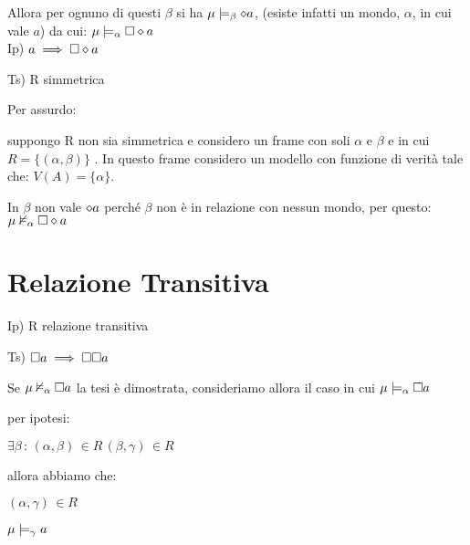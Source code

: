 Allora per ognuno di questi $\beta$ si ha $\mu\models_{\beta}\diamond a$,
(esiste infatti un mondo, $\alpha$, in cui vale $a$) da cui: $\mu\models_{\alpha}\square\diamond a$
\\


Ip) $a\implies\square\diamond a$

Ts) R simmetrica

Per assurdo:

suppongo R non sia simmetrica e considero un frame con soli $\alpha$
e $\beta$ e in cui $R=\{(\alpha,\beta)\}$ . In questo frame considero
un modello con funzione di verità tale che: $V(A)=\{\alpha\}$.

In $\beta$ non vale $\diamond a$ perché $\beta$ non è in relazione con
nessun mondo, per questo: $\mu\nvDash_{\alpha}\square\diamond a$

\begin{center}
\begin{center}   \end{center}
\par\end{center}




\section{Relazione Transitiva}

Ip) R relazione transitiva

Ts) $\square a\implies\square\square a$

Se $\mu\nvDash_{\alpha}\square a$ la tesi è dimostrata, consideriamo
allora il caso in cui $\mu\models_{\alpha}\square a$

per ipotesi:

$\exists\beta\,:\,(\alpha,\beta)\,\in R\,(\beta,\gamma)\,\in R$

allora abbiamo che:

$(\alpha,\gamma)\,\in R$

$\mu\models_{\gamma}a$ 

